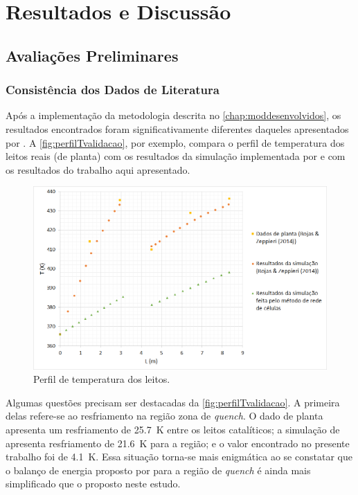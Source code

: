 %
% 
%
\chapter{Resultados e Discussão} \label{chap:resultados}

\section{Avaliações Preliminares} \label{sec:avaliacoesespreliminares}

\subsection{Consistência dos Dados de Literatura}
\label{sec:dadosliteratura}

Após a implementação da metodologia descrita no \autoref{chap:moddesenvolvidos},
os resultados encontrados foram significativamente diferentes daqueles apresentados
por . A \autoref{fig:perfilTvalidacao}, por
exemplo, compara o perfil de temperatura dos leitos reais (de planta) com os
resultados da simulação implementada por  e com os
resultados do trabalho aqui apresentado.

\begin{figure}[htb]
\centering \includegraphics[scale=0.4]{images/Chap4/perfilTvalidacao.png}
\caption{Perfil de temperatura dos leitos.}
\label{fig:perfilTvalidacao}
\end{figure}

Algumas questões precisam ser destacadas da \autoref{fig:perfilTvalidacao}.
A primeira delas refere-se ao resfriamento na região zona de \emph{quench}. O
dado de planta apresenta um resfriamento de \SI{25,7}{K} entre os leitos
catalíticos; a simulação de  apresenta resfriamento de
\SI{21,6}{K} para a região; e o valor encontrado no
presente trabalho foi de \SI{4,1}{K}. Essa situação torna-se mais enigmática ao
se constatar que o balanço de energia proposto por  para
a região de \emph{quench} é ainda mais simplificado que o proposto neste estudo.

